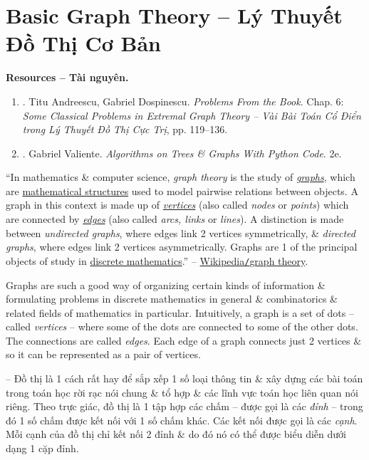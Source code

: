 \documentclass[oneside]{book}
\begin{document}

\section{Basic Graph Theory -- Lý Thuyết Đồ Thị Cơ Bản}

\textbf{\textsf{Resources -- Tài nguyên.}}
\begin{enumerate}
	\item \cite{Andreescu_Dospinescu2010}. {\sc Titu Andreescu, Gabriel Dospinescu}. {\it Problems From the Book}. Chap. 6: {\it Some Classical Problems in Extremal Graph Theory -- Vài Bài Toán Cổ Điển trong Lý Thuyết Đồ Thị Cực Trị}, pp. 119--136.
	
	\item \cite{Valiente2002, Valiente2021}. {\sc Gabriel Valiente}. {\it Algorithms on Trees \& Graphs With Python Code}. 2e.
\end{enumerate}
``In mathematics \& computer science, {\it graph theory} is the study of \href{https://en.wikipedia.org/wiki/Graph_(discrete_mathematics)}{\it graphs}, which are \href{https://en.wikipedia.org/wiki/Mathematical_structures}{mathematical structures} used to model pairwise relations between objects. A graph in this context is made up of \href{https://en.wikipedia.org/wiki/Vertex_(graph_theory)}{\it vertices} (also called {\it nodes} or {\it points}) which are connected by \href{https://en.wikipedia.org/wiki/Glossary_of_graph_theory_terms#edge}{\it edges} (also called {\it arcs, links} or {\it lines}). A distinction is made between {\it undirected graphs}, where edges link 2 vertices symmetrically, \& {\it directed graphs}, where edges link 2 vertices asymmetrically. Graphs are 1 of the principal objects of study in \href{https://en.wikipedia.org/wiki/Discrete_mathematics}{discrete mathematics}.'' -- \href{https://en.wikipedia.org/wiki/Graph_theory}{Wikipedia{\tt/}graph theory}.

Graphs are such a good way of organizing certain kinds of information \& formulating problems in discrete mathematics in general \& combinatorics \& related fields of mathematics in particular. Intuitively, a graph is a set of dots -- called {\it vertices} -- where some of the dots are connected to some of the other dots. The connections are called {\it edges}. Each edge of a graph connects just 2 vertices \& so it can be represented as a pair of vertices.

-- Đồ thị là 1 cách rất hay để sắp xếp 1 số loại thông tin \& xây dựng các bài toán trong toán học rời rạc nói chung \& tổ hợp \& các lĩnh vực toán học liên quan nói riêng. Theo trực giác, đồ thị là 1 tập hợp các chấm -- được gọi là các {\it đỉnh} -- trong đó 1 số chấm được kết nối với 1 số chấm khác. Các kết nối được gọi là các {\it cạnh}. Mỗi cạnh của đồ thị chỉ kết nối 2 đỉnh \& do đó nó có thể được biểu diễn dưới dạng 1 cặp đỉnh.
\end{document}
